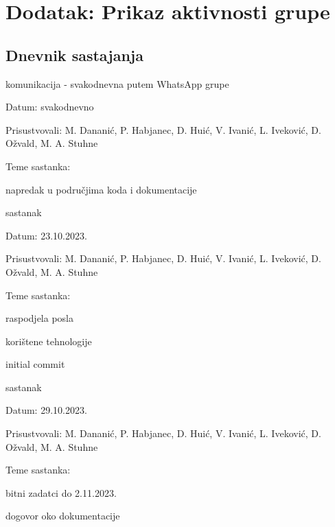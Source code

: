 \chapter*{Dodatak: Prikaz aktivnosti grupe}
		
		\section*{Dnevnik sastajanja}
		
		\begin{packed_enum}

			\item  komunikacija - svakodnevna putem WhatsApp grupe
			\item[] \begin{packed_item}
				\item Datum: svakodnevno
				\item Prisustvovali: M. Dananić, P. Habjanec, D. Huić, V. Ivanić, L. Iveković, D. Ožvald, M. A. Stuhne
				\item Teme sastanka:
				\begin{packed_item}
					\item  napredak u područjima koda i dokumentacije
				\end{packed_item}
			\end{packed_item}

			\item  sastanak
			\item[] \begin{packed_item}
				\item Datum: 23.10.2023.
				\item Prisustvovali: M. Dananić, P. Habjanec, D. Huić, V. Ivanić, L. Iveković, D. Ožvald, M. A. Stuhne
				\item Teme sastanka:
				\begin{packed_item}
					\item  raspodjela posla
					\item  korištene tehnologije
					\item  initial commit
				\end{packed_item}
			\end{packed_item}
			
			\item  sastanak
			\item[] \begin{packed_item}
				\item Datum: 29.10.2023.
				\item Prisustvovali: M. Dananić, P. Habjanec, D. Huić, V. Ivanić, L. Iveković, D. Ožvald, M. A. Stuhne
				\item Teme sastanka:
				\begin{packed_item}
					\item  bitni zadatci do 2.11.2023.
					\item  dogovor oko dokumentacije
				\end{packed_item}
			\end{packed_item}
			
			
		\end{packed_enum}
		

